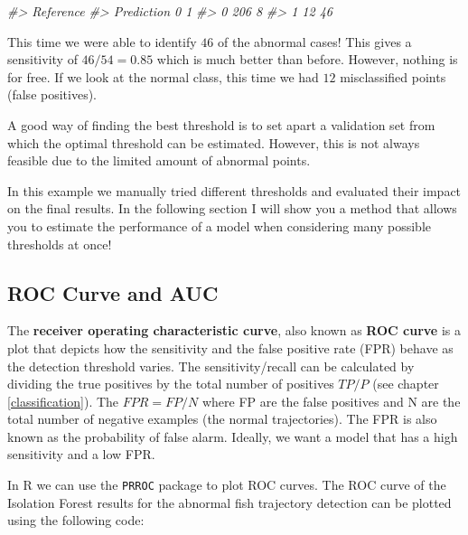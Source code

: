 \documentclass[
  11pt,
]{krantz}
\makeatletter
\newenvironment{Shaded}{\begin{snugshade}}{\end{snugshade}}
\newcommand{\CommentTok}[1]{\textcolor[rgb]{0.37,0.37,0.37}{\textit{#1}}}
\newenvironment{kframe}{%
\medskip{}
\setlength{\fboxsep}{.8em}
 \def\at@end@of@kframe{}%
 \ifinner\ifhmode%
  \def\at@end@of@kframe{\end{minipage}}%
  \begin{minipage}{\columnwidth}%
 \fi\fi%
 \def\FrameCommand##1{\hskip\@totalleftmargin \hskip-\fboxsep
 \colorbox{shadecolor}{##1}\hskip-\fboxsep
     \hskip-\linewidth \hskip-\@totalleftmargin \hskip\columnwidth}%
 \MakeFramed {\advance\hsize-\width
   \@totalleftmargin\z@ \linewidth\hsize
   \@setminipage}}%
 {\par\unskip\endMakeFramed%
 \at@end@of@kframe}
\newenvironment{rmdblock}[1]
  {
  \begin{itemize}
  \renewcommand{\labelitemi}{
    \raisebox{-.7\height}[0pt][0pt]{
      {\setkeys{Gin}{width=3em,keepaspectratio}\texttt{[image: images/icons/\#1]}}
    }
  }
  \setlength{\fboxsep}{1em}
  \begin{kframe}
  \item
  }
  {
  \end{kframe}
  \end{itemize}
  }
\newenvironment{rmdgoodpractice}
  {\begin{rmdblock}{goodpractice}}
  {\end{rmdblock}}
\makeatother
\begin{document}
\begin{Shaded}
\begin{Highlighting}[]
\CommentTok{\#\textgreater{}           Reference}
\CommentTok{\#\textgreater{} Prediction   0   1}
\CommentTok{\#\textgreater{}          0 206   8}
\CommentTok{\#\textgreater{}          1  12  46}
\end{Highlighting}
\end{Shaded}

This time we were able to identify \(46\) of the abnormal cases! This gives a sensitivity of \(46/54=0.85\) which is much better than before. However, nothing is for free. If we look at the normal class, this time we had \(12\) misclassified points (false positives).

\begin{rmdgoodpractice}
A good way of finding the best threshold is to set apart a validation set from which the optimal threshold can be estimated. However, this is not always feasible due to the limited amount of abnormal points.
\end{rmdgoodpractice}

In this example we manually tried different thresholds and evaluated their impact on the final results. In the following section I will show you a method that allows you to estimate the performance of a model when considering many possible thresholds at once!

\hypertarget{roc-curve-and-auc}{%
\subsection{ROC Curve and AUC}\label{roc-curve-and-auc}}

The \textbf{receiver operating characteristic curve}, also known as \textbf{ROC curve} is a plot that depicts how the sensitivity and the false positive rate (FPR) behave as the detection threshold varies. The sensitivity/recall can be calculated by dividing the true positives by the total number of positives \(TP/P\) (see chapter \ref{classification}). The \(FPR=FP/N\) where FP are the false positives and N are the total number of negative examples (the normal trajectories). The FPR is also known as the probability of false alarm. Ideally, we want a model that has a high sensitivity and a low FPR.

In R we can use the \texttt{PRROC} package \citep{prroc} to plot ROC curves. The ROC curve of the Isolation Forest results for the abnormal fish trajectory detection can be plotted using the following code:
\end{document}
